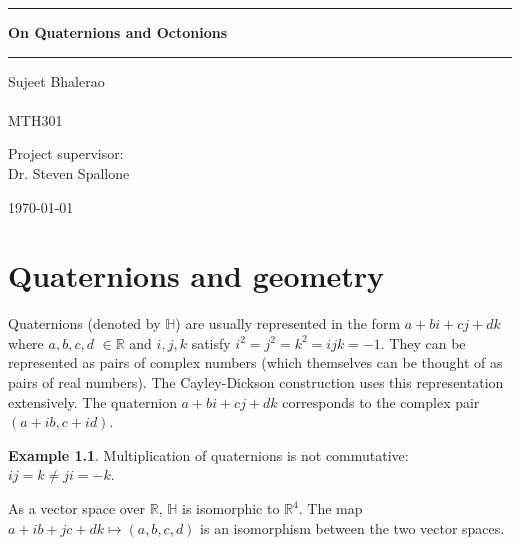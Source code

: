 \documentclass[11pt]{report}
\theoremstyle{plain}
\theoremstyle{definition}
\newtheorem{exmp}{Example} %
\begin{document}
	\begin{titlepage}
		\centering
		\vspace*{0.6in}
		\bgroup
		\hrule
		\vspace{0.2in}
		\huge \textbf{On Quaternions and Octonions} 
		\vspace{0.2in}
		\hrule
		\egroup
		\vspace{0.5in}
		\bgroup
		\Large Sujeet Bhalerao\\[0.1in]
		\\
		\vspace{0.5in}
		MTH301 
		\vspace{0.7in}
		\vspace{0.6in}
				
		Project supervisor:\\[0.2in]
		\Large Dr. Steven Spallone 
		\par
		\vspace{0.5in}
		
		\par
		\vspace{0.1in}
		
		\vspace{0.2in}
		\vfill
		\today
	\end{titlepage}

\chapter{Quaternions and geometry}

Quaternions (denoted by $ \mathbb{H} $) are usually represented in the form $  a + bi + cj + dk $ where $ a, b, c, d $ $ \in \mathbb{R}$ and $ i, j, k $ satisfy  $  i^2 = j^2 = k^2 = ijk = -1 $. They  can be represented as pairs of complex numbers (which themselves can be thought of as pairs of real numbers). The Cayley-Dickson construction uses this representation extensively. The quaternion $ a + bi + cj + dk $ corresponds to the complex pair $ (a+ib, c+id) $.
\begin{exmp}
Multiplication of quaternions is not commutative: $ ij = k \neq ji = -k $.
\end{exmp}
 \noindent As a vector space over $ \mathbb{R} $, $ \mathbb{H} $ is isomorphic to $ \mathbb{R}^4 $. The map $ a+ib+jc+dk \mapsto (a,b,c,d) $ is an isomorphism between the two vector spaces.
\end{document}
